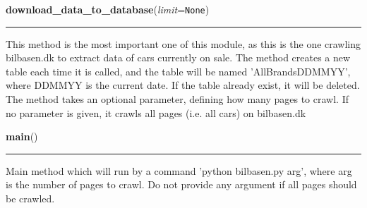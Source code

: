     \label{BilbasenDataMining:bilbasen:download_data_to_database}

    \vspace{0.5ex}

\hspace{.8\funcindent}\begin{boxedminipage}{\funcwidth}

    \raggedright \textbf{download\_data\_to\_database}(\textit{limit}={\tt None})

    \vspace{-1.5ex}

    \rule{\textwidth}{0.5\fboxrule}
\setlength{\parskip}{2ex}
    This method is the most important one of this module, as this is the 
    one crawling bilbasen.dk to extract data of cars currently on sale. The
    method creates a new table each time it is called, and the table will 
    be named 'AllBrandsDDMMYY', where DDMMYY is the current date. If the 
    table already exist, it will be deleted. The method takes an optional 
    parameter, defining how many pages to crawl. If no parameter is given, 
    it crawls all pages (i.e. all cars) on bilbasen.dk

\setlength{\parskip}{1ex}
    \end{boxedminipage}

    \label{BilbasenDataMining:bilbasen:main}

    \vspace{0.5ex}

\hspace{.8\funcindent}\begin{boxedminipage}{\funcwidth}

    \raggedright \textbf{main}()

    \vspace{-1.5ex}

    \rule{\textwidth}{0.5\fboxrule}
\setlength{\parskip}{2ex}
    Main method which will run by a command 'python bilbasen.py arg', where
    arg is the number of pages to crawl. Do not provide any argument if all
    pages should be crawled.

\setlength{\parskip}{1ex}
    \end{boxedminipage}


